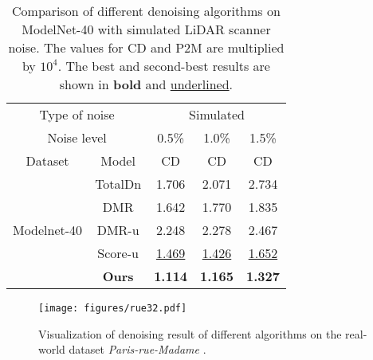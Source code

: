 \begin{table}
    \begin{center}
    \vspace{-0.05in}
\begin{tabular}{cc|ccc}
\hline
\multicolumn{2}{c|}{Type of noise}         &  \multicolumn{3}{c}{Simulated}  \\
\multicolumn{2}{c|}{Noise level} & \multicolumn{1}{c}{0.5\%} & \multicolumn{1}{c}{1.0\%} & \multicolumn{1}{c}{1.5\%} \\ \hline
\multicolumn{1}{c|}{Dataset}   & Model  & CD  & CD  & CD   \\ \hline
\multicolumn{1}{c|}{\multirow{5}{*}{Modelnet-40}} 
& TotalDn\cite{hermosilla2019TotalDenoising}   & 1.706     & 2.071  & 2.734        \\
\multicolumn{1}{c|}{}  & DMR \cite{luo2020DMR}  & 1.642 & 1.770  & 1.835     \\
\multicolumn{1}{c|}{}  & DMR-u\cite{luo2020DMR}  & 2.248  & 2.278  & 2.467   \\
\multicolumn{1}{c|}{}  & Score-u\cite{luo_score-based_2021} & \underline{1.469}   & \underline{1.426}    & \underline{1.652}    \\ \cline{2-5} 
\multicolumn{1}{c|}{}  & \bf Ours  &  \bf1.114   & \bf1.165   & \bf1.327  \\ \hline
\end{tabular}
\end{center}
\caption{Comparison of different denoising algorithms on ModelNet-40 with simulated LiDAR scanner noise.  The values for CD and P2M are multiplied by $10^4$. The best and second-best results are shown in \textbf{bold} and \underline{underlined}.}
\label{table:quantitativemd2}
\end{table}

\begin{figure*}
\begin{center}
    \texttt{[image: figures/rue32.pdf]}
\end{center}
\vspace{-0.05in}
\caption{Visualization of denoising result of different algorithms on the real-world dataset \textit{Paris-rue-Madame} \cite{serna2014paris}. }
\label{fig:rue32}
\end{figure*}



